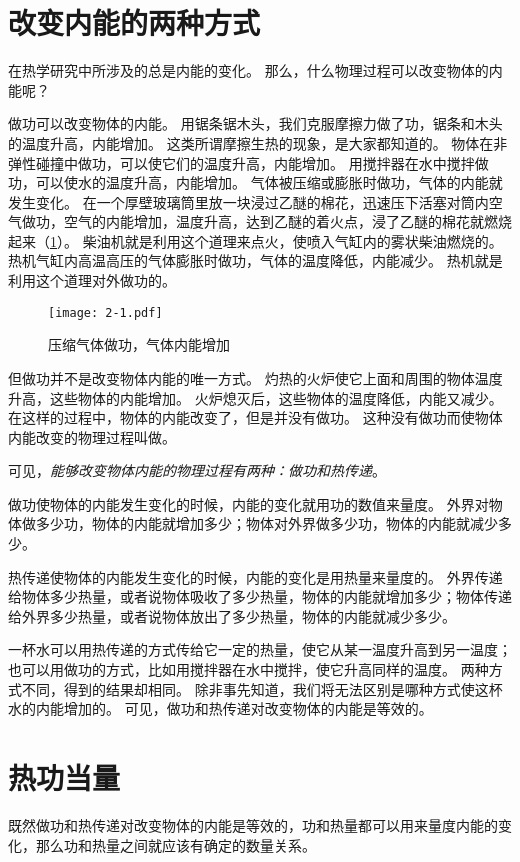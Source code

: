 \section{改变内能的两种方式}
在热学研究中所涉及的总是内能的变化。
那么，什么物理过程可以改变物体的内能呢？

做功可以改变物体的内能。
用锯条锯木头，我们克服摩擦力做了功，锯条和木头的温度升高，内能增加。
这类所谓摩擦生热的现象，是大家都知道的。
物体在非弹性碰撞中做功，可以使它们的温度升高，内能增加。
用搅拌器在水中搅拌做功，可以使水的温度升高，内能增加。
气体被压缩或膨胀时做功，气体的内能就发生变化。
在一个厚壁玻璃筒里放一块浸过乙醚的棉花，迅速压下活塞对筒内空气做功，空气的内能增加，温度升高，达到乙醚的着火点，浸了乙醚的棉花就燃烧起来（\cref{fig:2-1}）。
柴油机就是利用这个道理来点火，使喷入气缸内的雾状柴油燃烧的。
热机气缸内高温高压的气体膨胀时做功，气体的温度降低，内能减少。
热机就是利用这个道理对外做功的。

\begin{figure}
	\texttt{[image: 2-1.pdf]}
	\caption{压缩气体做功，气体内能增加}\label{fig:2-1}
\end{figure}

但做功并不是改变物体内能的唯一方式。
灼热的火炉使它上面和周围的物体温度升高，这些物体的内能增加。
火炉熄灭后，这些物体的温度降低，内能又减少。
在这样的过程中，物体的内能改变了，但是并没有做功。
这种没有做功而使物体内能改变的物理过程叫做。

可见，\emph{能够改变物体内能的物理过程有两种：做功和热传递}。

做功使物体的内能发生变化的时候，内能的变化就用功的数值来量度。
外界对物体做多少功，物体的内能就增加多少；物体对外界做多少功，物体的内能就减少多少。

热传递使物体的内能发生变化的时候，内能的变化是用热量来量度的。
外界传递给物体多少热量，或者说物体吸收了多少热量，物体的内能就增加多少；物体传递给外界多少热量，或者说物体放出了多少热量，物体的内能就减少多少。

一杯水可以用热传递的方式传给它一定的热量，使它从某一温度升高到另一温度；也可以用做功的方式，比如用搅拌器在水中搅拌，使它升高同样的温度。
两种方式不同，得到的结果却相同。
除非事先知道，我们将无法区别是哪种方式使这杯水的内能增加的。
可见，做功和热传递对改变物体的内能是等效的。

\section{热功当量}
既然做功和热传递对改变物体的内能是等效的，功和热量都可以用来量度内能的变化，那么功和热量之间就应该有确定的数量关系。

